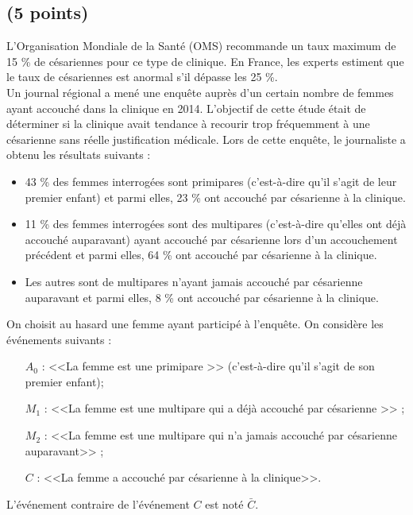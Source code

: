 \subsection{(5 points)}

L'Organisation Mondiale de la Santé (OMS) recommande un taux maximum de 15 \% de césariennes pour ce type de clinique. En France, les experts estiment que le taux de césariennes est anormal s'il dépasse les 25 \%.\\

Un journal régional a mené une enquête auprès d'un certain nombre de femmes ayant accouché dans la clinique en 2014. L'objectif de cette étude était de déterminer si la clinique avait tendance à recourir trop fréquemment à une césarienne sans réelle justification médicale. Lors de cette enquête, le journaliste a obtenu les résultats suivants :

\begin{itemize}
	\item 43 \% des femmes interrogées sont primipares (c'est-à-dire qu'il s'agit de leur premier enfant) et parmi elles, 23 \% ont accouché par césarienne à la clinique.
	\item 11 \% des femmes interrogées sont des multipares (c'est-à-dire qu'elles ont déjà accouché auparavant) ayant accouché par césarienne lors d'un accouchement précédent et parmi elles, 64 \% ont accouché par césarienne à la clinique.
	\item Les autres sont de multipares n'ayant jamais accouché par césarienne auparavant et parmi elles, 8 \% ont accouché par césarienne à la clinique.	
\end{itemize}

On choisit au hasard une femme ayant participé à l'enquête.
On considère les événements suivants :
\begin{itemize}
	\item[$A_0$ :]  <<La femme est une primipare >> (c'est-à-dire qu'il s'agit de son premier enfant);
	\item[$M_1$ :]  <<La femme est une multipare qui a déjà accouché par césarienne >> ;
	\item[$M_2$ :]  <<La femme est une multipare qui n'a jamais accouché par césarienne auparavant>> ;
	\item[$C$ :] <<La femme a accouché par césarienne à la clinique>>.
\end{itemize}

L'événement contraire de l'événement $C$ est noté $\bar{C}$.

